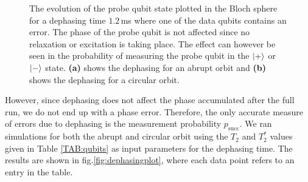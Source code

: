 \begin{figure}[H]
	\caption[oddeven]{The evolution of the probe qubit state plotted in the Bloch sphere for a dephasing time $1.2\, $ms where one of the data qubits contains an error. The phase of the probe qubit is not affected since no relaxation or excitation is taking place. The effect can however be seen in the probability of measuring the probe qubit in the $\ket{+}$ or $\ket{-}$ state. \textbf{(a)} shows the dephasing for an abrupt orbit and \textbf{(b)} shows the dephasing for a circular orbit.}
	\label{FIG:deph}
\end{figure}


However, since dephasing does not affect the phase accumulated after the full run, we do not end up with a phase error. Therefore, the only accurate measure of errors due to dephasing is the measurement probability $p_{\mathrm{succ}}$. We ran simulations for both the abrupt and circular orbit using the $T_2$ and $T_2^*$ values given in Table \ref{TAB:qubits} as input parameters for the dephasing time. The results are shown in fig.\@ \ref{fig:dephasingplot}, where each data point refers to an entry in the table. 

